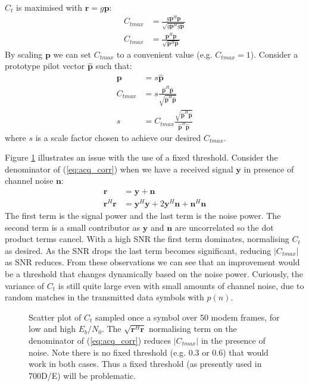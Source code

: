\documentclass{article}
\begin{document}
$C_t$ is maximised with $\bm{r}=g\bm{p}$:
\begin{equation}
\begin{split}
C_{tmax} &= \frac{g\bm{p}^H \bm{p}}{\sqrt{g\bm{p}^Hg\bm{p}}} \\
C_{tmax} &= \frac{\bm{p}^H \bm{p}}{\sqrt{\bm{p}^H\bm{p}}}
\end{split}
\end{equation}
By scaling $\bm{p}$ we can set $C_{tmax}$ to a convenient value (e.g. $C_{tmax}=1$). Consider a prototype pilot vector $\bm{\hat{p}}$ such that:
\begin{equation}
\begin{split}
\bm{p} &= s\bm{\hat{p}} \\
C_{tmax} &= s\frac{\bm{\hat{p}}^H \bm{\hat{p}}}{\sqrt{\bm{\hat{p}}^H\bm{\hat{p}}}} \\
s &= C_{tmax}\frac{\sqrt{\bm{\hat{p}}^H\bm{\hat{p}}}}{\bm{\hat{p}}^H \bm{\hat{p}}}
\end{split}
\end{equation}
where $s$ is a scale factor chosen to achieve our desired $C_{tmax}$.

Figure \ref{fig:acq_ct_scatter} illustrates an issue with the use of a fixed threshold.  Consider the denominator of (\ref{eq:acq_corr}) when we have a received signal $\bm{y}$ in presence of channel noise $\bm{n}$:
\begin{equation}
\begin{split}
\bm{r} &= \bm{y}+\bm{n} \\
\bm{r}^H\bm{r} &= \bm{y}^H\bm{y} + 2\bm{y}^H\bm{n} + \bm{n}^H\bm{n}
\end{split}
\end{equation}
The first term is the signal power and the last term is the noise power. The second term is a small contributor as $\bm{y}$ and $\bm{n}$ are uncorrelated so the dot product terms cancel. With a high SNR the first term dominates, normalising $C_t$ as desired. As the SNR drops the last term becomes significant, reducing $|C_{tmax}|$ as SNR reduces.  From these observations we can see that an improvement would be a threshold that changes dynamically based on the noise power. Curiously, the variance of $C_t$ is still quite large even with small amounts of channel noise, due to random matches in the transmitted data symbols with $p(n)$. 

\begin{figure}[H]
\caption{Scatter plot of $C_t$ sampled once a symbol over 50 modem frames, for low and high $E_b/N_0$. The $\sqrt{\bm{r}^H\bm{r}}$ normalising term on the denominator of (\ref{eq:acq_corr}) reduces $|C_{tmax}|$ in the presence of noise. Note there is no fixed threshold (e.g. 0.3 or 0.6) that would work in both cases. Thus a fixed threshold (as presently used in 700D/E) will be problematic.}
\label{fig:acq_ct_scatter}
\begin{center}

\end{center}
\end{figure}
\end{document}

